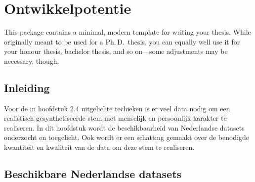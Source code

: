 \chapter{Ontwikkelpotentie}

\begin{center}
  \begin{minipage}{0.5\textwidth}
    \begin{small}
    \end{small}
  \end{minipage}
  \vspace{0.5cm}
\end{center}

\noindent This package contains a minimal, modern template for writing your
thesis. While originally meant to be used for a Ph.\,D.\ thesis, you can
equally well use it for your honour thesis, bachelor thesis, and so
on---some adjustments may be necessary, though.

\section{Inleiding}

Voor de in hoofdstuk 2.4 uitgelichte techieken is er veel data nodig om een realistisch gesynthetiseerde stem met menselijk en persoonlijk karakter te realiseren. In dit hoofdstuk wordt de beschikbaarheid van Nederlandse datasets onderzocht en toegelicht. Ook wordt er een schatting gemaakt over de benodigde kwantiteit en kwaliteit van de data om deze stem te realiseren.


\section{Beschikbare Nederlandse datasets}

